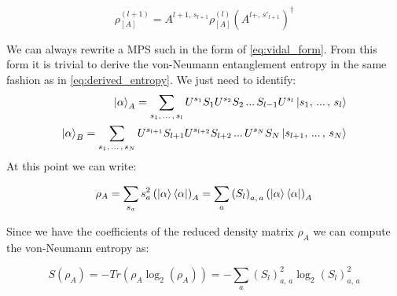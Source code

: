 \documentclass[11pt]{article}
\theoremstyle{definition}
\begin{document}
\begin{equation}
\rho^{(l+1)}_{[A]} = A^{l+1, \, s_{l+1}} \rho^{(l)}_{[A]} \left( A^{l+, \, s'_{l+1}} \right)^\dag
\end{equation}


We can always rewrite a MPS such in the form of \autoref{eq:vidal_form}. From this form it is trivial to derive the von-Neumann entanglement entropy in the same fashion as in \autoref{eq:derived_entropy}. We just need to identify:
\begin{align}
\ket {\alpha}_A = \sum_{s_1, \, ... \, , \, s_l} U^{s_1} S_{1}U^{s_2} S_{2} \, ... \,S_{l-1} U^{s_l}  \ket{s_1, \, ... \, , \, s_l}\\
\ket {\alpha}_B = \sum_{s_1, \, ... \, , \, s_N} U^{s_{l+1}} S_{{l+1}}U^{s_{l+2}} S_{l+2} \, ... \, U^{s_N} S_{N} \ket{s_{l+1}, \, ... \, , \, s_N}
\end{align}
At this point we can write:

\begin{equation}\label{eq:canonical_rho_a}
\rho_A =  \sum_{s_a} s^2_a  \left( \ket{\alpha} \bra{\alpha}\right)_A= \sum_a \left( S_{l} \right)_{a, \,a} \left( \ket{\alpha} \bra{\alpha}\right)_A
\end{equation}

Since we have the coefficients of the reduced density matrix $\rho_A$ we can compute the von-Neumann entropy as:


\begin{equation}\label{eq:derived_entropy}
S(\rho_A)=-Tr(\rho_A\log_2(\rho_A))= -\sum_a \left( S_{l} \right)_{a, \,a}^2 \log_2 \left( S_{l} \right)_{a, \,a}^2
\end{equation}























%
%



{}
\end{document}
